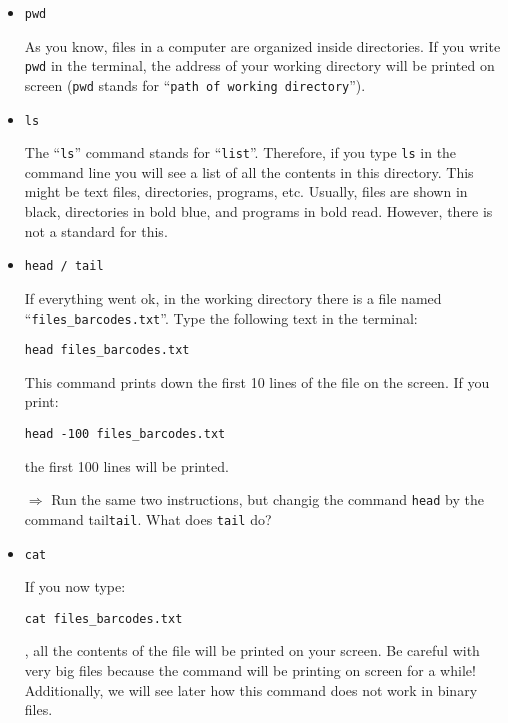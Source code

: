 \documentclass[11pt]{article}
\begin{document}
\begin{itemize}
\item \texttt{pwd}

As you know, files in a computer are organized inside directories. If you write \texttt{pwd} in the terminal, the address of your working directory will be printed on screen (\texttt{pwd} stands for ``\texttt{path of working directory}'').

\item \texttt{ls}

The ``\texttt{ls}'' command stands for ``\texttt{list}''. Therefore, if you type \texttt{ls} in the command line you will see a list of all the contents in this directory. This might be text files, directories, programs, etc. Usually, files are shown in black, directories in bold blue, and programs in bold read. However, there is not a standard for this. 

\item \texttt{head / tail}

If everything went ok, in the working directory there is a file named ``\texttt{files\_barcodes.txt}''. Type the following text in the terminal: 

\begin{verbatim}
head files_barcodes.txt
\end{verbatim}

This command prints down the first 10 lines of the file on the screen. If you print:

\begin{verbatim}
head -100 files_barcodes.txt
\end{verbatim}

the first 100 lines will be printed. 

\vspace{1em}
\hrulefill

$\Rightarrow$ Run the same two instructions, but changig the command  \texttt{head} by the command tail\texttt{tail}. What does \texttt{tail} do?

\hrulefill
\vspace{1em}


\item \texttt{cat}

If you now type:

\begin{verbatim}
cat files_barcodes.txt
\end{verbatim}
, all the contents of the file will be printed on your screen. Be careful with very big files because the command will be printing on screen for a while! Additionally, we will see later how this command does not work in binary files. 


\end{itemize}
\end{document}
